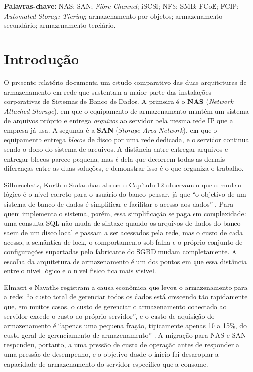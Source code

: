 \documentclass[11pt,a4paper]{article}
\begin{document}
\vspace{4mm}
\noindent\textbf{Palavras-chave:} NAS; SAN; \textit{Fibre Channel}; iSCSI; NFS; SMB; FCoE; FCIP;
\textit{Automated Storage Tiering}; armazenamento por objetos; armazenamento secundário;
armazenamento terciário.

\clearpage
\tableofcontents
\clearpage

\section{Introdução}
\label{sec:metodologia}

O presente relatório documenta um estudo comparativo das duas arquiteturas de armazenamento em
rede que sustentam a maior parte das instalações corporativas de Sistemas de Banco de Dados. A
primeira é o \textbf{NAS} (\textit{Network Attached Storage}), em que o equipamento de armazenamento
mantém um sistema de arquivos próprio e entrega \emph{arquivos} ao servidor pela mesma rede IP que a
empresa já usa. A segunda é a \textbf{SAN} (\textit{Storage Area Network}), em que o equipamento
entrega \emph{blocos} de disco por uma rede dedicada, e o servidor continua sendo o dono do sistema
de arquivos. A distância entre entregar arquivos e entregar blocos parece pequena, mas é dela que
decorrem todas as demais diferenças entre as duas soluções, e demonstrar isso é o que organiza o
trabalho.

Silberschatz, Korth e Sudarshan abrem o Capítulo 12 observando que o modelo lógico é o nível
correto para o usuário do banco pensar, já que ``o objetivo de um sistema de banco de dados é
simplificar e facilitar o acesso aos dados'' \cite{silberschatz2020}. Para quem implementa o
sistema, porém, essa simplificação se paga em complexidade: uma consulta SQL não muda de sintaxe
quando os arquivos de dados do banco saem de um disco local e passam a ser acessados pela rede, mas
o custo de cada acesso, a semântica de lock, o comportamento sob falha e o próprio conjunto de
configurações suportadas pelo fabricante do SGBD mudam completamente. A escolha da arquitetura de
armazenamento é um dos pontos em que essa distância entre o nível lógico e o nível físico fica mais
visível.

Elmasri e Navathe registram a causa econômica que levou o armazenamento para a rede: ``o custo
total de gerenciar todos os dados está crescendo tão rapidamente que, em muitos casos, o custo de
gerenciar o armazenamento conectado ao servidor excede o custo do próprio servidor'', e o custo de
aquisição do armazenamento é ``apenas uma pequena fração, tipicamente apenas 10 a 15\%, do custo
geral de gerenciamento de armazenamento'' \cite{elmasri2018}. A migração para NAS e SAN respondeu,
portanto, a uma pressão de custo de operação antes de responder a uma pressão de desempenho, e o
objetivo desde o início foi desacoplar a capacidade de armazenamento do servidor específico que a
consome.
\end{document}
